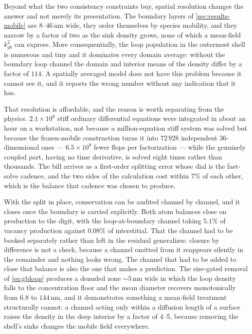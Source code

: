 Beyond what the two consistency constraints buy, spatial resolution changes the
answer and not merely its presentation. The boundary layers of
\cref{sec:results-mobile} are $8$--$46\,$nm wide, they order themselves by
species mobility, and they narrow by a factor of two as the sink density grows,
none of which a mean-field $k^{2}_{gb}$ can express. More consequentially, the
loop population in the outermost shell is numerous and tiny and it dominates
every domain average: without the boundary loop channel the domain and interior
means of the \cloop{} density differ by a factor of $114$. A spatially averaged
model does not have this problem because it cannot see it, and it reports the
wrong number without any indication that it has.

That resolution is affordable, and the reason is worth separating from the
physics. $2.1\times10^{8}$ stiff ordinary differential equations were integrated
in about an hour on a workstation, not because a million-equation stiff system
was solved but because the frozen-mobile construction turns it into $72\,928$
independent $36$-dimensional ones --- $6.5\times10^{9}$ fewer flops per
factorization --- while the genuinely coupled part, having no time derivative, is
solved eight times rather than thousands. The bill arrives as a first-order
splitting error whose dial is the fast-solve cadence, and the two sides of the
calculation cost within $7\%$ of each other, which is the balance that cadence
was chosen to produce.

With the split in place, conservation can be audited channel by channel, and it
closes once the boundary is carried explicitly. Both atom balances close on
production to the digit, with the loop-at-boundary channel taking $5.1\%$ of
vacancy production against $0.08\%$ of interstitial. That the channel had to be
booked separately rather than left in the residual generalizes: closure by
difference is not a check, because a channel omitted from it reappears silently
in the remainder and nothing looks wrong. The channel that had to be added to
close that balance is also the one that makes a prediction. The size-gated
removal of \cref{eq:gbloop} produces a denuded zone $\sim5\,$nm wide in which the
loop density falls to the concentration floor and the mean diameter recovers
monotonically from $6.8$ to $144\,$nm, and it demonstrates something a mean-field
treatment structurally cannot: a channel acting only within a diffusion length of
a surface raises the \cloop{} density in the deep interior by a factor of 4--5,
because removing the shell's sinks changes the mobile field everywhere.

